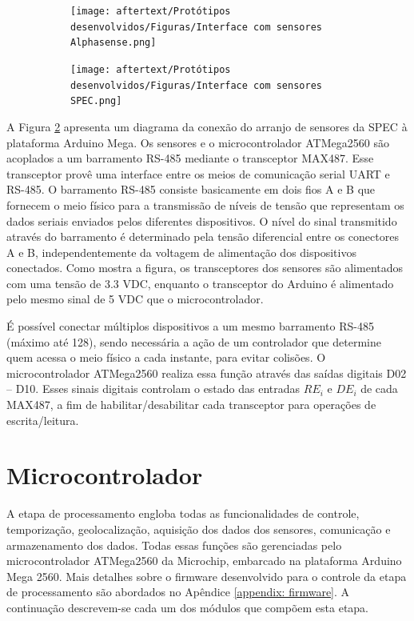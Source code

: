 \begin{figure}[t]
    \centering
    \caption{Interface entre os sensores e o microcontrolador Arduino. a) Alphasense, b) SPEC}
    \begin{subfigure}{0.39\textwidth}
        \texttt{[image: aftertext/Protótipos desenvolvidos/Figuras/Interface com sensores Alphasense.png]}
        \caption{}
        \label{fig:interface-alpha}
    \end{subfigure}
    \hfill
    \begin{subfigure}{0.6\textwidth}
        \texttt{[image: aftertext/Protótipos desenvolvidos/Figuras/Interface com sensores SPEC.png]}
        \caption{}
        \label{fig:interface-spec}
    \end{subfigure}
    \hfill
    \label{fig:circuitos-interface}
\end{figure}

A Figura \ref{fig:interface-spec} apresenta um diagrama da conexão do arranjo de sensores da SPEC à plataforma Arduino Mega. Os sensores e o microcontrolador ATMega2560 são acoplados a um barramento RS-485 mediante o transceptor MAX487. Esse transceptor provê uma interface entre os meios de comunicação serial UART e RS-485. O barramento RS-485 consiste basicamente em dois fios A e B que fornecem o meio físico para a transmissão de níveis de tensão que representam os dados seriais enviados pelos diferentes dispositivos. O nível do sinal transmitido através do barramento é determinado pela tensão diferencial entre os conectores A e B, independentemente da voltagem de alimentação dos dispositivos conectados. Como mostra a figura, os transceptores dos sensores são alimentados com uma tensão de 3.3 VDC, enquanto o transceptor do Arduino é alimentado pelo mesmo sinal de 5 VDC que o microcontrolador.

É possível conectar múltiplos dispositivos a um mesmo barramento RS-485 (máximo até 128), sendo necessária a ação de um controlador que determine quem acessa o meio físico a cada instante, para evitar colisões. O microcontrolador ATMega2560 realiza essa função através das saídas digitais D02 – D10. Esses sinais digitais controlam o estado das entradas $RE_i$ e $DE_i$ de cada MAX487, a fim de habilitar/desabilitar cada transceptor para operações de escrita/leitura.

\section{Microcontrolador}
A etapa de processamento engloba todas as funcionalidades de controle, temporização, geolocalização, aquisição dos dados dos sensores, comunicação e armazenamento dos dados. Todas essas funções são gerenciadas pelo microcontrolador ATMega2560 da Microchip, embarcado na plataforma Arduino Mega 2560. Mais detalhes sobre o firmware desenvolvido para o controle da etapa de processamento são abordados no Apêndice \ref{appendix: firmware}. A continuação descrevem-se cada um dos módulos que compõem esta etapa.

